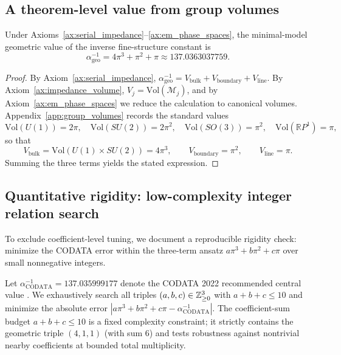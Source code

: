 \subsection{A theorem-level value from group volumes}
\begin{theorem}
\label{thm:alpha_three_channel}
Under Axioms~\ref{ax:serial_impedance}--\ref{ax:em_phase_spaces}, the minimal-model geometric value of the inverse fine-structure constant is
\begin{equation}
\alpha_{\mathrm{geo}}^{-1}=4\pi^3+\pi^2+\pi\approx 137.0363037759.
\end{equation}
\end{theorem}
\begin{proof}
By Axiom~\ref{ax:serial_impedance}, $\alpha_{\mathrm{geo}}^{-1}=V_{\mathrm{bulk}}+V_{\mathrm{boundary}}+V_{\mathrm{line}}$. By Axiom~\ref{ax:impedance_volume}, $V_j=\mathrm{Vol}(\mathcal{M}_j)$, and by Axiom~\ref{ax:em_phase_spaces} we reduce the calculation to canonical volumes. Appendix~\ref{app:group_volumes} records the standard values
\begin{equation}
\mathrm{Vol}(U(1))=2\pi,\quad \mathrm{Vol}(SU(2))=2\pi^2,\quad
\mathrm{Vol}(SO(3))=\pi^2,\quad \mathrm{Vol}(\mathbb{R}P^1)=\pi,
\end{equation}
so that
\begin{equation}
V_{\mathrm{bulk}}=\mathrm{Vol}(U(1)\times SU(2))=4\pi^3,\qquad
V_{\mathrm{boundary}}=\pi^2,\qquad
V_{\mathrm{line}}=\pi.
\end{equation}
Summing the three terms yields the stated expression.
\end{proof}

\subsection{Quantitative rigidity: low-complexity integer relation search}
To exclude coefficient-level tuning, we document a reproducible rigidity check: minimize the CODATA error within the three-term ansatz $a\pi^3+b\pi^2+c\pi$ over small nonnegative integers.

Let $\alpha_{\mathrm{CODATA}}^{-1}=137.035999177$ denote the CODATA 2022 recommended central value \cite{CODATA2022RMP}. We exhaustively search all triples $(a,b,c)\in\mathbb{Z}_{\ge 0}^3$ with $a+b+c\le 10$ and minimize the absolute error $|a\pi^3+b\pi^2+c\pi-\alpha_{\mathrm{CODATA}}^{-1}|$.
The coefficient-sum budget $a+b+c\le 10$ is a fixed complexity constraint; it strictly contains the geometric triple $(4,1,1)$ (with sum $6$) and tests robustness against nontrivial nearby coefficients at bounded total multiplicity.


